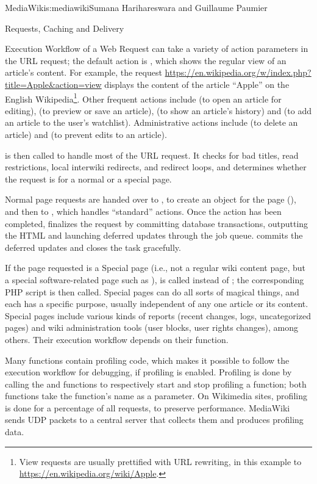 \begin{aosachapter}{MediaWiki}{s:mediawiki}{Sumana Harihareswara and Guillaume Paumier}
\begin{aosasect1}{Requests, Caching and Delivery}
\begin{aosasect2}{Execution Workflow of a Web Request}
 can take a variety of action parameters in the URL
request; the default action is , which shows the regular
view of an article's content. For example, the request
\url{https://en.wikipedia.org/w/index.php?title=Apple\&action=view}
displays the content of the article ``Apple'' on the English
Wikipedia\footnote{View requests are usually prettified with URL
  rewriting, in this example to
  \url{https://en.wikipedia.org/wiki/Apple}.}. Other frequent actions
include  (to open an article for editing), 
(to preview or save an article),  (to show an article's
history) and  (to add an article to the user's
watchlist). Administrative actions include  (to delete an
article) and  (to prevent edits to an article).

 is then called to handle most of
the URL request. It checks for bad titles, read restrictions, local
interwiki redirects, and redirect loops, and determines whether the
request is for a normal or a special page.

Normal page requests are handed over to
, to create an 
object for the page (), and then to
, which handles ``standard''
actions. Once the action has been completed,
 finalizes the request by committing
database transactions, outputting the HTML and launching deferred
updates through the job queue.  commits
the deferred updates and closes the task gracefully.

If the page requested is a Special page (i.e., not a regular wiki
content page, but a special software-related page such as
),  is called
instead of ; the corresponding PHP script is
then called. Special pages can do all sorts of magical things, and
each has a specific purpose, usually independent of any one article or
its content. Special pages include various kinds of reports (recent
changes, logs, uncategorized pages) and wiki administration tools
(user blocks, user rights changes), among others. Their execution
workflow depends on their function.

Many functions contain profiling code, which makes it possible to
follow the execution workflow for debugging, if profiling is
enabled. Profiling is done by calling the  and
 functions to respectively start and stop profiling
a function; both functions take the function's name as a parameter. On
Wikimedia sites, profiling is done for a percentage of all requests,
to preserve performance. MediaWiki sends UDP packets to a central
server that collects them and produces profiling data.


\end{aosasect2}
\end{aosasect1}
\end{aosachapter}
